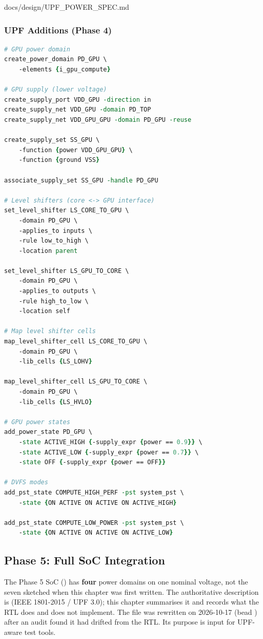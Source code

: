 \begin{relocated}{docs/design/UPF_POWER_SPEC.md}
\subsubsection{UPF Additions (Phase 4)}\label{ds:ch:upf-power-spec:upf-additions-phase-4}

\begin{lstlisting}[language=tcl]
# GPU power domain
create_power_domain PD_GPU \
    -elements {i_gpu_compute}

# GPU supply (lower voltage)
create_supply_port VDD_GPU -direction in
create_supply_net VDD_GPU -domain PD_TOP
create_supply_net VDD_GPU_GPU -domain PD_GPU -reuse

create_supply_set SS_GPU \
    -function {power VDD_GPU_GPU} \
    -function {ground VSS}

associate_supply_set SS_GPU -handle PD_GPU

# Level shifters (core <-> GPU interface)
set_level_shifter LS_CORE_TO_GPU \
    -domain PD_GPU \
    -applies_to inputs \
    -rule low_to_high \
    -location parent

set_level_shifter LS_GPU_TO_CORE \
    -domain PD_GPU \
    -applies_to outputs \
    -rule high_to_low \
    -location self

# Map level shifter cells
map_level_shifter_cell LS_CORE_TO_GPU \
    -domain PD_GPU \
    -lib_cells {LS_LOHV}

map_level_shifter_cell LS_GPU_TO_CORE \
    -domain PD_GPU \
    -lib_cells {LS_HVLO}

# GPU power states
add_power_state PD_GPU \
    -state ACTIVE_HIGH {-supply_expr {power == 0.9}} \
    -state ACTIVE_LOW {-supply_expr {power == 0.7}} \
    -state OFF {-supply_expr {power == OFF}}

# DVFS modes
add_pst_state COMPUTE_HIGH_PERF -pst system_pst \
    -state {ON ACTIVE ON ACTIVE ON ACTIVE_HIGH}

add_pst_state COMPUTE_LOW_POWER -pst system_pst \
    -state {ON ACTIVE ON ACTIVE ON ACTIVE_LOW}
\end{lstlisting}

\subsection{Phase 5: Full SoC Integration}\label{ds:ch:upf-power-spec:phase-5-full-soc-integration}

The Phase 5 SoC (\code{soc_top}) has \textbf{four} power domains on one
nominal voltage, not the seven sketched when this chapter was first
written. The authoritative description is
 (IEEE 1801-2015 / UPF 3.0); this
chapter summarises it and records what the RTL does and does not
implement. The file was rewritten on 2026-10-17 (bead ) after
an audit found it had drifted from the RTL. Its purpose is input for
UPF-aware test tools.


\end{relocated}
